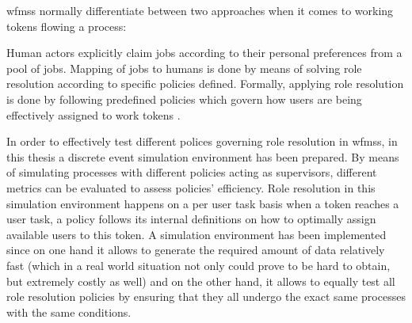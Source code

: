 \glspl{wfms} normally differentiate between two approaches when it comes to working tokens flowing a process:

\begin{enumerate}
	 Human actors explicitly claim jobs according to their personal preferences from a pool of jobs.
	 Mapping of jobs to humans is done by means of solving role resolution according to specific policies defined. Formally, applying role resolution is done by following predefined policies which govern how users are being effectively assigned to work tokens \citep{Zeng2005}. 
\end{enumerate}

In order to effectively test different polices governing role resolution in \glspl{wfms}, in this thesis a discrete event simulation environment has been prepared. By means of simulating processes with different policies acting as supervisors, different metrics can be evaluated to assess policies' efficiency. Role resolution in this simulation environment happens on a per user task basis \ie when a token reaches a user task, a policy follows its internal definitions on how to optimally assign available users to this token. A simulation environment has been implemented since on one hand it allows to generate the required amount of data relatively fast (which in a real world situation not only could prove to be hard to obtain, but extremely costly as well) and on the other hand, it allows to equally test all role resolution policies by ensuring that they all undergo the exact same processes with the same conditions.